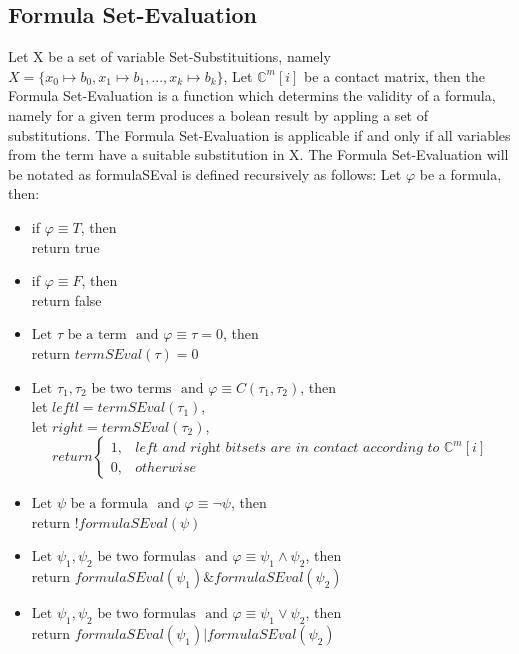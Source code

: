 \documentclass{article}
\begin{document}
	\subsection*{Formula Set-Evaluation}
		Let X be a set of variable Set-Substituitions, namely $ X = \{ x_0 \longmapsto b_0, x_1 \longmapsto b_1, ..., x_k \longmapsto b_k \}$, 
		Let $\mathbb{C}^m[i]$ be a contact matrix,
		then the Formula Set-Evaluation is a function which determins the validity of a formula, namely for a given term 
		produces a bolean result by appling a set of substitutions.
		The Formula Set-Evaluation is applicable if and only if all variables from the term have a suitable substitution in X.
		\newline
		\newline
		The Formula Set-Evaluation will be notated as formulaSEval is defined recursively as follows:
		\newline
		Let $\varphi$ be a formula, then:
		\begin{itemize}
			\item if $\varphi \equiv T$, then \\
				return true
			\item if $\varphi \equiv F$, then \\
				return false
			\item $\text{Let } \tau \text{ be a term } \text{ and } \varphi \equiv \tau = 0$, then \\
				return $termSEval(\tau) = 0$
			\item $\text{Let } \tau_1, \tau_2 \text{ be two terms } \text{ and }  \varphi \equiv C(\tau_1, \tau_2)$, then \\
				let  $leftl = termSEval(\tau_1)$, \\
				let  $right = termSEval(\tau_2)$, \\
\[return  \begin{cases} 
      1, & \textit{left and right bitsets are in contact according to } \mathbb{C}^m[i] \\
      0, & otherwise
   \end{cases}
\]
			\item $\text{Let } \psi \text{ be a formula } \text{ and } \varphi \equiv \neg{\psi}$, then \\
				return $!formulaSEval(\psi)$
			\item $\text{Let } \psi_1, \psi_2 \text{ be two formulas } \text{ and } \varphi \equiv \psi_1 \wedge \psi_2$, then \\
				return $formulaSEval(\psi_1) \& formulaSEval(\psi_2)$
			\item $\text{Let } \psi_1, \psi_2 \text{ be two formulas } \text{ and } \varphi \equiv \psi_1 \vee \psi_2$, then \\
				return $formulaSEval(\psi_1) | formulaSEval(\psi_2)$
		\end{itemize}
\end{document}
